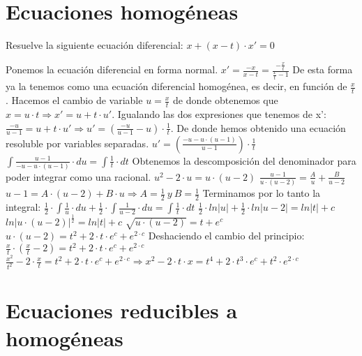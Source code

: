 
\section{Ecuaciones homogéneas}
\begin{ejer}
	Resuelve la siguiente ecuación diferencial: $x+(x-t)\cdot x' = 0$
\end{ejer}
\begin{sol}
	Ponemos la ecuación diferencial en forma normal.  
	$x' = \frac{-x}{x-t} = \frac{-\frac{x}{t}}{\frac{x}{t}-1}$  
	De esta forma ya la tenemos como una ecuación diferencial homogénea, es decir, en función de $\frac{x}{t}$.  
	Hacemos el cambio de variable $u = \frac{x}{t}$ de donde obtenemos que $x = u\cdot t \Rightarrow x' = u + t\cdot u'$.  
	Igualando las dos expresiones que tenemos de x':  
	$\frac{-u}{u-1} = u + t\cdot u' \Rightarrow u' = (\frac{-u}{u-1}-u)\cdot \frac{1}{t}$.  
	De donde hemos obtenido una ecuación resoluble por variables separadas.
	$u' = (\frac{-u-u\cdot (u-1)}{u-1})\cdot \frac{1}{t}$  
	$\int \frac{u-1}{-u-u\cdot (u-1)}\cdot du = \int \frac{1}{t}\cdot dt$
	Obtenemos la descomposición del denominador para poder integrar como una racional.  
	$u^2 -2\cdot u = u\cdot (u-2)$  
	$\frac{u-1}{u\cdot (u-2)} = \frac{A}{u} + \frac{B}{u-2}$  
	$u-1 = A\cdot (u-2)  + B\cdot u \Rightarrow A=\frac{1}{2} \ y \ B=\frac{1}{2}$  
	Terminamos por lo tanto la integral:  
	$\frac{1}{2}\cdot \int \frac{1}{u}\cdot du + \frac{1}{2}\cdot \int \frac{1}{u-2}\cdot du = \int \frac{1}{t}\cdot dt$  
	$\frac{1}{2}\cdot ln|u| + \frac{1}{2}\cdot ln|u-2| = ln|t| + c$  
	$ln|u\cdot (u-2)|^{\frac{1}{2}} = ln|t| + c$  
	$\sqrt{u\cdot (u-2)} = t + e^c$  
	$u\cdot (u-2) = t^2 + 2\cdot t\cdot e^c + e^{2\cdot c}$  
	Deshaciendo el cambio del principio:  
	$\frac{x}{t}\cdot (\frac{x}{t}-2) = t^2 + 2\cdot t\cdot e^c + e^{2\cdot c}$  
	$\frac{x^2}{t^2}-2\cdot \frac{x}{t} = t^2 + 2\cdot t\cdot e^c + e^{2\cdot c} \Rightarrow x^2 - 2\cdot t\cdot x = t^4 + 2\cdot t^3\cdot e^c + t^2\cdot e^{2\cdot c}$
\end{sol}


\section{Ecuaciones reducibles a homogéneas}

